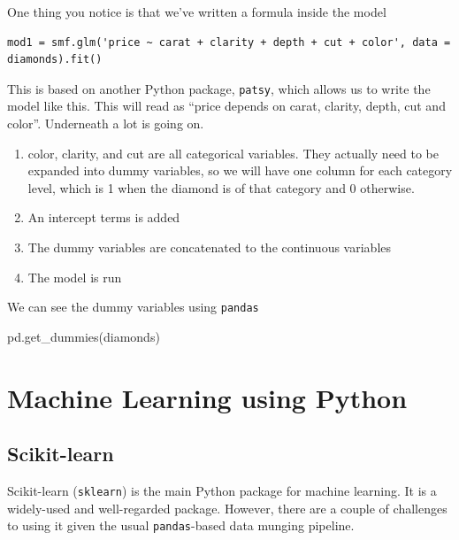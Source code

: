 \documentclass[
  letterpaper,
]{scrbook}
\newenvironment{Shaded}{\begin{snugshade}}{\end{snugshade}}
\newcommand{\NormalTok}[1]{#1}
\providecommand{\tightlist}{%
  \setlength{\itemsep}{0pt}\setlength{\parskip}{0pt}}
\begin{document}
One thing you notice is that we've written a formula inside the model

\begin{verbatim}
mod1 = smf.glm('price ~ carat + clarity + depth + cut + color', data = diamonds).fit()
\end{verbatim}

This is based on another Python package, \texttt{patsy}, which allows us to write the model like this. This will read as
``price depends on carat, clarity, depth, cut and color''. Underneath a lot is going on.

\begin{enumerate}
\def\labelenumi{\arabic{enumi}.}
\tightlist
\item
  color, clarity, and cut are all categorical variables. They actually need to be expanded into dummy variables, so we will have one column for each category level, which is 1 when the diamond is of that category and 0 otherwise.
\item
  An intercept terms is added
\item
  The dummy variables are concatenated to the continuous variables
\item
  The model is run
\end{enumerate}

We can see the dummy variables using \texttt{pandas}

\begin{Shaded}
\begin{Highlighting}[]
\NormalTok{pd.get\_dummies(diamonds)}
\end{Highlighting}
\end{Shaded}

\hypertarget{machine-learning-using-python}{%
\chapter{Machine Learning using Python}\label{machine-learning-using-python}}

\hypertarget{scikit-learn}{%
\section{Scikit-learn}\label{scikit-learn}}

Scikit-learn (\texttt{sklearn}) is the main Python package for machine learning. It is a widely-used and well-regarded package. However, there are a couple of challenges to using it given the usual \texttt{pandas}-based data munging pipeline.
\end{document}
